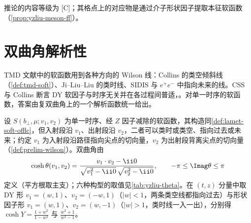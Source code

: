 推论的内容等级为 [C]；其格点上的对应物是通过介子形状因子提取本征软函数（\cref{prop:yzliu-meson-ff}）。

\section{双曲角解析性}\label{sec:yzliu-analyticity}

TMD 文献中的软函数用到各种方向的 Wilson 线：Collins 的类空倾斜线（\cref{def:tmd-soft}）、Ji--Liu--Liu 的类时线、SIDIS 与 $e^+e^-$ 中指向未来的线。CSS 与 Collins 断言 DY 软因子与时序无关并在各过程间普适\cite{CollinsMetz2004}，\cite[第~13~章]{Collins2011}。对单一时序的软函数，答案由复双曲角上的一个解析函数统一给出。

\begin{definition}[双曲角与六种构型]\label{def:yzliu-hyperbolic-angle}
设 $S(b_\perp,\mu;v_1,v_2)$ 为单一时序、经 $Z$ 因子减除的软函数，其构造同\cref{def:lamet-soft-offlc}，但入射段沿 $v_1$、出射段沿 $v_2$，二者可以类时或类空、指向过去或未来\cite[式~(93)]{Liu:2022nnk}；约定 $v_1$ 为入射段沿路径指向尖点的切向量，$v_2$ 为出射段背离尖点的切向量（\cref{def:prelim-wilson}）。双曲角由
\begin{equation}\label{eq:yzliu-theta}
\cosh\theta(v_1,v_2)=\frac{v_1\cdot v_2-\ii0}{\sqrt{v_1^2-\ii0}\,\sqrt{v_2^2-\ii0}},\qquad -\pi\le\Imag\theta\le\pi
\end{equation}
定义（平方根取主支）；六种构型的取值见\cref{tab:yzliu-theta}。在 $(t,z)$ 分量中取 DY 形 $v_1=(w,1)$、$v_2=(-w,1)$（$|w|<1$，两条类空线都指向过去）与形状因子形 $v_1=(w,1)$、$v_2=(w,-1)$（$|w|>1$，类时线一入一出），分别得 $\cosh Y=\frac{1+w^2}{1-w^2}$ 与 $\frac{w^2+1}{w^2-1}$。%
\end{definition}

